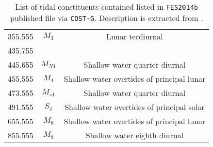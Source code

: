 \begin{table}[h!]
\begin{tabular}{ccc}
      355.555 & $M_3$ & Lunar terdiurnal \\
      435.755 & & \\
      445.655 & $M_{N4}$ & Shallow water quarter diurnal \\
      455.555 & $M_4$ & Shallow water overtides of principal lunar \\
      473.555 & $M_{s4}$ & Shallow water quarter diurnal \\
      491.555 & $S_4$ & Shallow water overtides of principal solar \\
      655.555 & $M_6$ & Shallow water overtides of principal lunar \\
      855.555 & $M_8$ & Shallow water eighth diurnal\\
      \hline
  \end{tabular}
  \caption{List of tidal constituents contained listed in \texttt{FES2014b} published 
    file via \texttt{COST-G}. Description is extracted from \cite{Beauducel2023}.}
  \label{table:tidal-constituents-fes14b}
\end{table}
